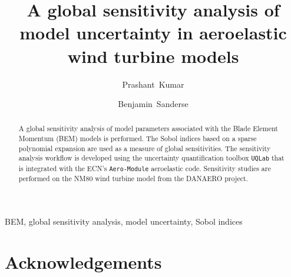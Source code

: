 \documentclass[review]{elsarticle}
\numberwithin{equation}{section}
\newcommand{\myreferences}{../references,../Mendeley_refs}
\numberwithin{equation}{section}
\begin{document}
\begin{frontmatter}
\title{A global sensitivity analysis of model uncertainty in aeroelastic wind turbine models}

\address[cwi]{Centrum Wiskunde \& Informatica (CWI), Amsterdam, The Netherlands}
\author[]{Prashant~Kumar}

\author{Benjamin~Sanderse}

\begin{abstract}
A global sensitivity analysis of model parameters associated with the Blade Element Momentum (BEM) models is performed. The Sobol indices based on a sparse polynomial  expansion are used as a measure of global sensitivities. The sensitivity analysis workflow is developed using the uncertainty quantification toolbox \texttt{UQLab} that is integrated with the ECN's \texttt{Aero-Module} aeroelastic code. Sensitivity studies are performed on the NM80 wind turbine model from the DANAERO project.
\end{abstract}
\begin{keyword}
BEM, global sensitivity analysis, model uncertainty, Sobol indices
\end{keyword}
\end{frontmatter}

\linenumbers



\section*{Acknowledgements}

\newpage


\newpage

\appendix

\end{document}

